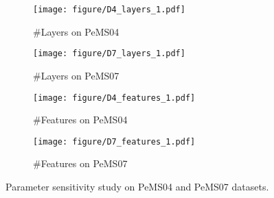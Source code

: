 \begin{figure}
    \centering
    \begin{subfigure}{0.23\textwidth}
        \texttt{[image: figure/D4\_layers\_1.pdf]}
        \vspace{-6mm}
        \caption{\#Layers on PeMS04}
        \label{fig:recall_dim}
    \end{subfigure}
    \begin{subfigure}{0.22\textwidth}
        \texttt{[image: figure/D7\_layers\_1.pdf]}
        \vspace{-6mm}
        \caption{\#Layers on PeMS07}
        \label{fig:ndcg_dim}
    \end{subfigure}
    \begin{subfigure}{0.23\textwidth}
        \texttt{[image: figure/D4\_features\_1.pdf]}
        \vspace{-6mm}
        \caption{\#Features on PeMS04}
        \label{fig:recall_l}
    \end{subfigure}
    \begin{subfigure}{0.205\textwidth}
        \texttt{[image: figure/D7\_features\_1.pdf]}
        \vspace{-6mm}
        \caption{\#Features on PeMS07}
        \label{fig:ndcg_l}
    \end{subfigure}
    \vspace{-1mm}
    \caption{Parameter sensitivity study on PeMS04 and PeMS07 datasets.}
    \label{fig:abla}
    \vspace{-6mm}
\end{figure}